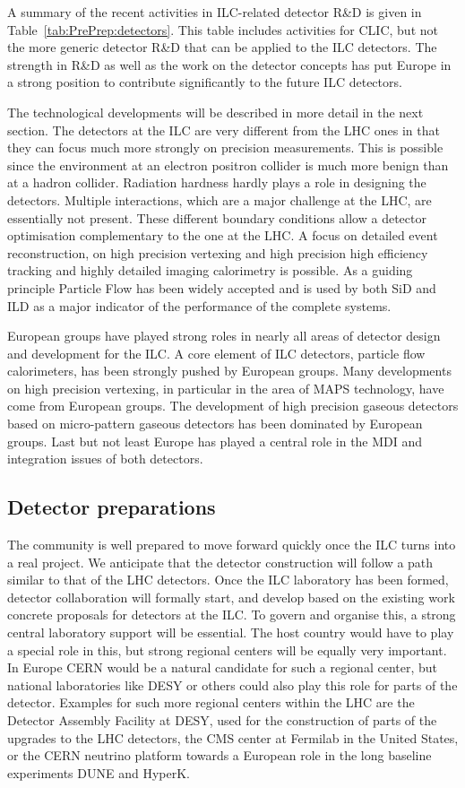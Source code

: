 \documentclass[%
 reprint,
 amsmath,amssymb,
 aps,
]{revtex4-1}
\begin{document}
A summary of the recent  activities in ILC-related detector R\&D is given in Table~\ref{tab:PrePrep:detectors}. This table includes activities for CLIC, but not the more generic detector R\&D that can be applied to the 
ILC detectors. The strength in R\&D as well as the work on the detector concepts has put Europe in a strong position to contribute significantly to the future ILC detectors.


The technological developments will be described in more detail in the next section. The detectors at the ILC are very different from the LHC ones in that they can focus much more strongly on precision measurements. This is possible since the environment at an electron positron collider is much more benign than at a hadron collider. Radiation hardness hardly plays a role in designing the detectors. Multiple interactions, which are a major challenge at the LHC, are essentially not present. These different boundary conditions allow a detector optimisation complementary to the one at the LHC. A focus on detailed event reconstruction, on high precision vertexing and high precision high efficiency tracking and highly detailed imaging calorimetry is possible. As a guiding principle Particle Flow has been widely accepted and is used by both SiD and ILD as a major indicator of the performance of the complete systems. 

European groups have played strong roles in nearly all areas of detector design and development for the ILC. A core element of ILC detectors, particle flow calorimeters, has been strongly pushed by European groups. Many developments on high precision vertexing, in particular in the area of MAPS technology, have come from European groups. The development of high precision gaseous detectors based on micro-pattern gaseous detectors has been dominated by European groups. Last but not least Europe has played a central role in the MDI and integration issues of both detectors.  

\subsection{Detector preparations~\label{sec:prepphase:detectors}}
The community is well prepared to move forward quickly once the ILC turns into a real project. We anticipate that the detector construction will follow a path similar to that of the LHC detectors. Once the ILC laboratory has been formed, detector collaboration will formally start, and develop based on the existing work concrete proposals for detectors at the ILC. To govern and organise this, a strong central laboratory support will be essential. The host country would have to play a special role in this, but strong regional centers will be equally very important. In Europe CERN would be a natural candidate for such a regional center, but national laboratories like DESY or others could also play this role for parts of the detector. Examples for such more regional centers within the LHC are the Detector Assembly Facility at DESY, used for the construction of parts of the upgrades to the LHC detectors, the CMS center at Fermilab in the United States, or the CERN neutrino platform towards a European role in the long baseline experiments DUNE and HyperK. 
\end{document}
